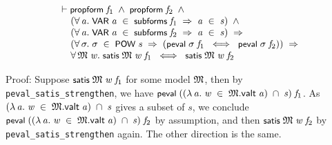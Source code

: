 \documentclass[letterpaper]{article}
\renewcommand{\HOLConst}[1]{{\textsf{\upshape\small #1}}}
\renewcommand{\HOLinline}[1]{\ensuremath{#1}}
\newenvironment{holmath}{\begin{displaymath}\begin{array}{l}}{\end{array}\end{displaymath}\ignorespacesafterend}
\begin{document}
\begin{holmath}
  \ensuremath{\HOLTokenTurnstile}\HOLConst{propform}\;\HOLFreeVar{f\sb{\mathrm{1}}}\;\HOLSymConst{\HOLTokenConj{}}\;\HOLConst{propform}\;\HOLFreeVar{f\sb{\mathrm{2}}}\;\HOLSymConst{\HOLTokenConj{}}\\
\;\;\;\;\;(\HOLSymConst{\HOLTokenForall{}}\HOLBoundVar{a}.\;\HOLConst{VAR}\;\HOLBoundVar{a}\;\HOLSymConst{\HOLTokenIn{}}\;\HOLConst{subforms}\;\HOLFreeVar{f\sb{\mathrm{1}}}\;\HOLSymConst{\HOLTokenImp{}}\;\HOLBoundVar{a}\;\HOLSymConst{\HOLTokenIn{}}\;\HOLFreeVar{s})\;\HOLSymConst{\HOLTokenConj{}}\\
\;\;\;\;\;(\HOLSymConst{\HOLTokenForall{}}\HOLBoundVar{a}.\;\HOLConst{VAR}\;\HOLBoundVar{a}\;\HOLSymConst{\HOLTokenIn{}}\;\HOLConst{subforms}\;\HOLFreeVar{f\sb{\mathrm{2}}}\;\HOLSymConst{\HOLTokenImp{}}\;\HOLBoundVar{a}\;\HOLSymConst{\HOLTokenIn{}}\;\HOLFreeVar{s})\;\HOLSymConst{\HOLTokenImp{}}\\
\;\;\;\;\;(\HOLSymConst{\HOLTokenForall{}}\HOLBoundVar{\ensuremath{\sigma}}.\;\HOLBoundVar{\ensuremath{\sigma}}\;\HOLSymConst{\HOLTokenIn{}}\;\HOLConst{POW}\;\HOLFreeVar{s}\;\HOLSymConst{\HOLTokenImp{}}\;(\HOLConst{peval}\;\HOLBoundVar{\ensuremath{\sigma}}\;\HOLFreeVar{f\sb{\mathrm{1}}}\;\HOLSymConst{\HOLTokenEquiv{}}\;\HOLConst{peval}\;\HOLBoundVar{\ensuremath{\sigma}}\;\HOLFreeVar{f\sb{\mathrm{2}}}))\;\HOLSymConst{\HOLTokenImp{}}\\
\;\;\;\;\;\HOLSymConst{\HOLTokenForall{}}\HOLBoundVar{\ensuremath{\mathfrak{M}}}\;\HOLBoundVar{w}.\;\HOLConst{satis}\;\HOLBoundVar{\ensuremath{\mathfrak{M}}}\;\HOLBoundVar{w}\;\HOLFreeVar{f\sb{\mathrm{1}}}\;\HOLSymConst{\HOLTokenEquiv{}}\;\HOLConst{satis}\;\HOLBoundVar{\ensuremath{\mathfrak{M}}}\;\HOLBoundVar{w}\;\HOLFreeVar{f\sb{\mathrm{2}}}
\end{holmath}

Proof: Suppose \HOLinline{\HOLConst{satis}\;\HOLFreeVar{\ensuremath{\mathfrak{M}}}\;\HOLFreeVar{w}\;\HOLFreeVar{f\sb{\mathrm{1}}}} for some model \HOLinline{\HOLFreeVar{\ensuremath{\mathfrak{M}}}}, then by \texttt{peval_satis_strengthen}, we have \HOLinline{\HOLConst{peval}\;((\HOLTokenLambda{}\HOLBoundVar{a}.\;\HOLFreeVar{w}\;\HOLSymConst{\HOLTokenIn{}}\;\HOLFreeVar{\ensuremath{\mathfrak{M}}}.\HOLFieldName{valt}\;\HOLBoundVar{a})\;\HOLSymConst{\HOLTokenInter{}}\;\HOLFreeVar{s})\;\HOLFreeVar{f\sb{\mathrm{1}}}}. As \HOLinline{(\HOLTokenLambda{}\HOLBoundVar{a}.\;\HOLFreeVar{w}\;\HOLSymConst{\HOLTokenIn{}}\;\HOLFreeVar{\ensuremath{\mathfrak{M}}}.\HOLFieldName{valt}\;\HOLBoundVar{a})\;\HOLSymConst{\HOLTokenInter{}}\;\HOLFreeVar{s}} gives a subset of $s$, we conclude \HOLinline{\HOLConst{peval}\;((\HOLTokenLambda{}\HOLBoundVar{a}.\;\HOLFreeVar{w}\;\HOLSymConst{\HOLTokenIn{}}\;\HOLFreeVar{\ensuremath{\mathfrak{M}}}.\HOLFieldName{valt}\;\HOLBoundVar{a})\;\HOLSymConst{\HOLTokenInter{}}\;\HOLFreeVar{s})\;\HOLFreeVar{f\sb{\mathrm{2}}}} by assumption, and then \HOLinline{\HOLConst{satis}\;\HOLFreeVar{\ensuremath{\mathfrak{M}}}\;\HOLFreeVar{w}\;\HOLFreeVar{f\sb{\mathrm{2}}}} by \texttt{peval_satis_strengthen} again. The other direction is the same.
\end{document}
